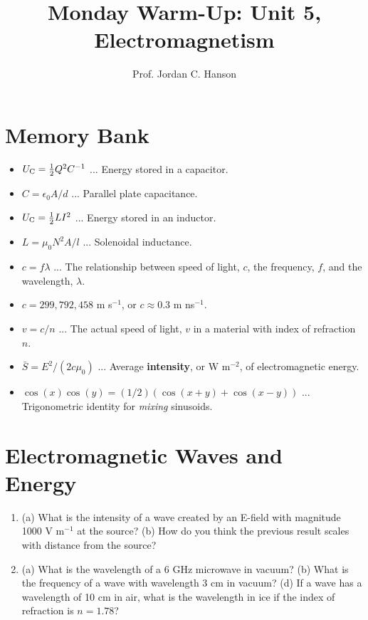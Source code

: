 \documentclass{article}
\begin{document}
\twocolumn

\title{Monday Warm-Up: Unit 5, Electromagnetism}
\author{Prof. Jordan C. Hanson}

\maketitle

\section{Memory Bank}

\begin{itemize}
\item $U_{\rm C} = \frac{1}{2}Q^2C^{-1}$ ... Energy stored in a capacitor.
\item $C = \epsilon_0 A/d$ ... Parallel plate capacitance.
\item $U_{\rm C} = \frac{1}{2}LI^2$ ... Energy stored in an inductor.
\item $L = \mu_0 N^2 A/l$ ... Solenoidal inductance.
\item $c = f\lambda$ ... The relationship between speed of light, $c$, the frequency, $f$, and the wavelength, $\lambda$.
\item $c = 299,792,458$ m s$^{-1}$, or $c \approx 0.3$ m ns$^{-1}$.
\item $v = c/n$ ... The actual speed of light, $v$ in a material with index of refraction $n$.
\item $\bar{S} = E^2/(2c\mu_0)$ ... Average \textbf{intensity}, or W m$^{-2}$, of electromagnetic energy.
\item $\cos(x)\cos(y) = (1/2)(\cos(x+y) + \cos(x-y))$ ... Trigonometric identity for \textit{mixing} sinusoids.
\end{itemize}

\section{Electromagnetic Waves and \\ Energy}

\begin{enumerate}
\item (a) What is the intensity of a wave created by an E-field with magnitude 1000 V m$^{-1}$ at the source? (b) How do you think the previous result scales with distance from the source? \\ \vspace{2.5cm}
\item (a) What is the wavelength of a 6 GHz microwave in vacuum? (b) What is the frequency of a wave with wavelength 3 cm in vacuum? (d) If a wave has a wavelength of 10 cm in air, what is the wavelength in ice if the index of refraction is $n = 1.78$? \\ \vspace{3cm}
\end{enumerate}
\end{document}
